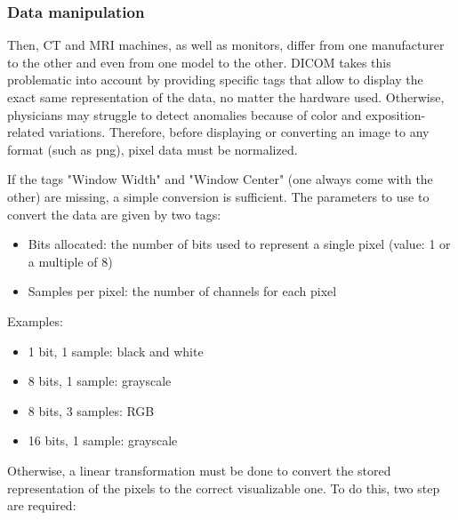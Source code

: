 \subsubsection{Data manipulation}
Then, CT and MRI machines, as well as monitors, differ from one manufacturer to the other and even from one model to the other. DICOM takes this problematic into account by providing specific tags that allow to display the exact same representation of the data, no matter the hardware used. Otherwise, physicians may struggle to detect anomalies because of color and exposition-related variations. 
Therefore, before displaying or converting an image to any format (such as png), pixel data must be normalized. 

If the tags "Window Width" and "Window Center" (one always come with the other) are missing, a simple conversion is sufficient. The parameters to use to convert the data are given by two tags: 
\begin{itemize}
	\item Bits allocated: the number of bits used to represent a single pixel (value: 1 or a multiple of 8)
	\item Samples per pixel: the number of channels for each pixel

\end{itemize}

Examples: 
\begin{itemize}
\item 1 bit, 1 sample: black and white
\item 8 bits, 1 sample: grayscale
\item 8 bits, 3 samples: RGB
\item 16 bits, 1 sample: grayscale

\end{itemize} 

Otherwise, a linear transformation must be done to convert the stored representation of the pixels to the correct visualizable one. To do this, two step are required: 

